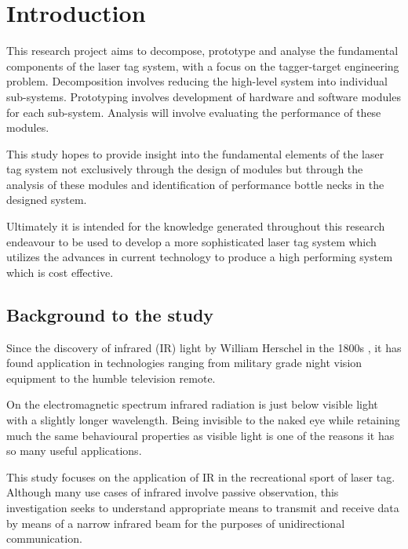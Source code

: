 \chapter{Introduction}
\label{ch_introduction}

This research project aims to decompose, prototype and analyse the fundamental components of the laser tag system, with a focus on the tagger-target engineering problem. Decomposition involves reducing the high-level system into individual sub-systems. Prototyping involves development of hardware and software modules for each sub-system. Analysis will involve evaluating the performance of these modules.

This study hopes to provide insight into the fundamental elements of the laser tag system not exclusively through the design of modules but through the analysis of these modules and identification of performance bottle necks in the designed system.

Ultimately it is intended for the knowledge generated throughout this research endeavour to be used to develop a more sophisticated laser tag system which utilizes the advances in current technology to produce a high performing system which is cost effective.

\section{Background to the study}
Since the discovery of infrared (IR) light by William Herschel in the 1800s \cite{Rowan-Robinson2013}, it has found application in technologies ranging from military grade night vision equipment to the humble television remote.

On the electromagnetic spectrum infrared radiation is just below visible light with a slightly longer wavelength. Being invisible to the naked eye while retaining much the same behavioural properties as visible light is one of the reasons it has so many useful applications.

This study focuses on the application of IR in the recreational sport of laser tag. Although many use cases of infrared involve passive observation, this investigation seeks to understand appropriate means to transmit and receive data by means of a narrow infrared beam for the purposes of unidirectional communication.

